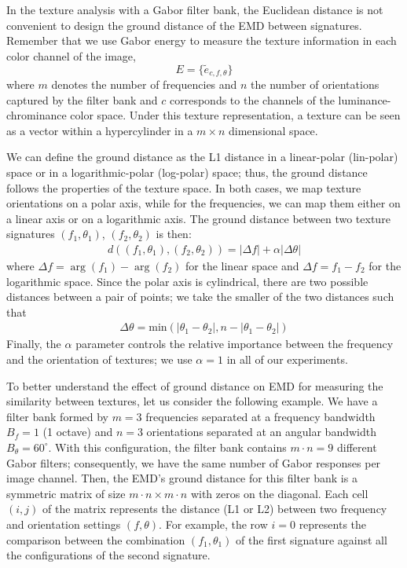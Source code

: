 In the texture analysis with a Gabor filter bank, the Euclidean distance is not convenient to design the ground distance of the EMD between signatures. Remember that we use Gabor energy to measure the texture information in each color channel of the image,
\begin{equation}\label{eq:feature_space}
	E = \{\widetilde{e}_{c, f, \theta}\}
\end{equation}
where $m$ denotes the number of frequencies and $n$ the number of orientations captured by the filter bank and $c$ corresponds to the channels of the luminance-chrominance color space. Under this texture representation, a texture can be seen as a vector within a hypercylinder in a $m \times n$ dimensional space.

We can define the ground distance as the L1 distance in a linear-polar (lin-polar) space or in a logarithmic-polar (log-polar) space; thus, the ground distance follows the properties of the texture space. In both cases, we map texture orientations on a polar axis, while for the frequencies, we can map them either on a linear axis or on a logarithmic axis. The ground distance between two texture signatures $(f_1, \theta_1)$, $(f_2, \theta_2)$ is then:
\begin{eqnarray} \label{eq:emd_lin_log_polar}
	d((f_1, \theta_1), (f_2, \theta_2)) = |\Delta f| + \alpha |\Delta \theta|
\end{eqnarray}
where $\Delta f = \arg{(f_1)} - \arg{(f_2)}$ for the linear space and $\Delta f = f_1 - f_2$ for the logarithmic space. Since the polar axis is cylindrical, there are two possible distances between a pair of points; we take the smaller of the two distances such that
\begin{eqnarray} \label{eq:emd_ground_dist_polar_axis}
	\Delta \theta = \mathrm{min}(|\theta_1-\theta_2|, n-|\theta_1-\theta_2|) \nonumber
\end{eqnarray}
Finally, the $\alpha$ parameter controls the relative importance between the frequency and the orientation of textures; we use $\alpha=1$ in all of our experiments.

To better understand the effect of ground distance on EMD for measuring the similarity between textures, let us consider the following example. We have a filter bank formed by $m = 3$ frequencies separated at a frequency bandwidth $B_f = 1$ (1 octave) and $n = 3$ orientations separated at an angular bandwidth $B_\theta = 60^\circ$. With this configuration, the filter bank contains $ m \cdot n = 9 $ different Gabor filters; consequently, we have the same number of Gabor responses per image channel. Then, the EMD's ground distance for this filter bank is a symmetric matrix of size $ m \cdot n \times m \cdot n $ with zeros on the diagonal. Each cell $(i, j)$ of the matrix represents the distance (L1 or L2) between two frequency and orientation settings $(f,\theta)$. For example, the row $i = 0$ represents the comparison between the combination $(f_1, \theta_1)$ of the first signature against all the configurations of the second signature.

